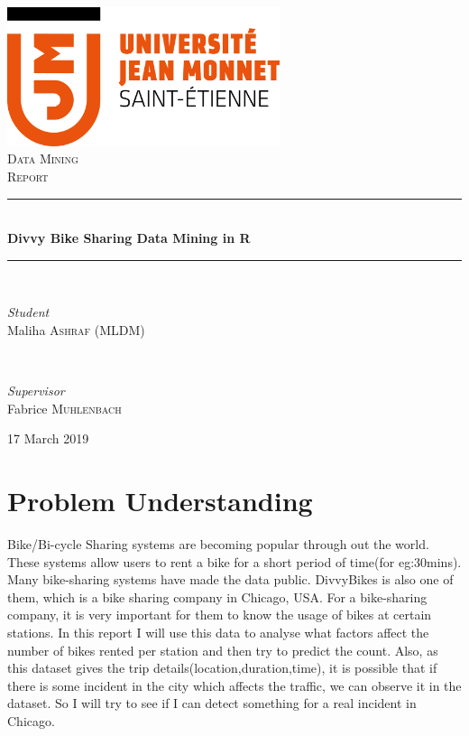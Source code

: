 \documentclass[11pt]{article}
\begin{document}
\begin{titlepage}
	\newcommand{\HRule}{\rule{\linewidth}{0.3mm}}	
	\center
	\vfill\vfill
	\includegraphics[width=0.6\textwidth]{logoUJM.png}\\[2cm]	
	\textsc{\LARGE Data Mining}\\[1.0cm]
	\textsc{\Large Report}\\[0.5cm]	
	\HRule\\[0.4cm]
	{\LARGE\bfseries Divvy Bike Sharing Data Mining in R}\\[0.4cm]
	\HRule\\[0.8cm]	
	\begin{minipage}{0.4\textwidth}
		\begin{flushleft}
			\large
			\textit{Student}\\
			Maliha \textsc{Ashraf (MLDM)}
		\end{flushleft}
	\end{minipage}
	~
	\begin{minipage}{0.4\textwidth}
		\begin{flushright}
			\large
			\textit{Supervisor}\\
			Fabrice \textsc{Muhlenbach}
		\end{flushright}
	\end{minipage}
	\vfill\vfill\vfill	
	{\large 17 March 2019}	
	\vfill
\end{titlepage}
\newpage

\section{Problem Understanding}
Bike/Bi-cycle Sharing systems are becoming popular through out the world. These systems allow users to rent a bike for a short period of time(for eg:30mins). Many bike-sharing systems have made the data public. DivvyBikes is also one of them, which is a bike sharing company in Chicago, USA. For a bike-sharing company, it is very important for them to know the usage of bikes at certain stations. In this report I will use this data to analyse what factors affect the number of bikes rented per station and then try to predict the count.
\newline\newline
Also, as this dataset gives the trip details(location,duration,time), it is possible that if there is some incident in the city which affects the traffic, we can observe it in the dataset. So I will try to see if I can detect something for a real incident in Chicago.
\end{document}
